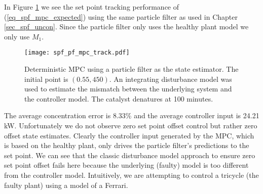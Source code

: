 In Figure \ref{fig_spf_pf_mpc_track} we see the set point tracking performance of (\ref{eq_spf_mpc_expected}) using the same particle filter as used in Chapter \ref{sec_spf_uncon}. Since the particle filter only uses the healthy plant model we only use $M_1$. 
\begin{figure}[H] 
\centering
\texttt{[image: spf\_pf\_mpc\_track.pdf]}
\caption{Deterministic MPC using a particle filter as the state estimator. The initial point is $(0.55, 450)$. An integrating disturbance model was used to estimate the mismatch between the underlying system and the controller model. The catalyst denatures at 100 minutes.}
\label{fig_spf_pf_mpc_track}
\end{figure}
The average concentration error is 8.33\% and the average controller input is 24.21 kW. Unfortunately we do not observe zero set point offset control but rather zero offset state estimates. Clearly the controller input generated by the MPC, which is based on the healthy plant, only drives the particle filter's predictions to the set point. We can see that the classic disturbance model approach \cite{lee} to ensure zero set point offset fails here because the underlying (faulty) model is too different from the controller model. Intuitively, we are attempting to control a tricycle (the faulty plant) using a model of a Ferrari.  

